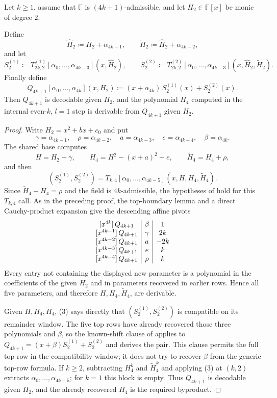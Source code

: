 \begin{lemma}\label{lem:Q4k+1-from-H2}
    Let $k\ge 1$, assume that $\mathbb F$ is $(4k+1)$-admissible, and let
    $H_2\in\mathbb{F}[x]$ be monic of degree $2$.

    Define
    \[
      \hat H_2 \coloneqq H_2+\alpha_{4k-1},
      \qquad
      \tilde H_2 \coloneqq \hat H_2+\alpha_{4k-2},
    \]
    and let
    \[
      S^{(1)}_2 \coloneqq T^{(1)}_{2k,2}[\alpha_0,\ldots,\alpha_{4k-3}](x,\hat H_2),
      \qquad
      S^{(2)}_2 \coloneqq T^{(2)}_{2k,2}[\alpha_0,\ldots,\alpha_{4k-3}](x,\hat H_2,\tilde H_2).
    \]
    Finally define
    \[
      Q_{4k+1}[\alpha_0,\ldots,\alpha_{4k}](x,H_2)\coloneqq (x+\alpha_{4k})\,S^{(1)}_2(x)+S^{(2)}_2(x).
    \]
    Then $Q_{4k+1}$ is decodable given $H_2$, and the polynomial $H_4$ computed in the internal even-$k$, $l=1$ step is derivable from $Q_{4k+1}$ given $H_2$.
\end{lemma}
\begin{proof}
    Write $H_2=x^2+bx+c_0$ and put
    \[
      \gamma=\alpha_{4k-1},\quad \rho=\alpha_{4k-2},\quad
      a=\alpha_{4k-3},\quad e=\alpha_{4k-4},\quad
      \beta=\alpha_{4k}.
    \]
    The shared base computes
    \[
      H=H_2+\gamma,\qquad
      H_4=H^2-(x+a)^2+e,\qquad
      \tilde H_4=H_4+\rho,
    \]
    and then
    \[
      (S^{(1)}_2,S^{(2)}_2)
       =T_{k,4}[\alpha_0,\ldots,\alpha_{4k-5}]
          (x,H,H_4,\tilde H_4).
    \]
    Since $\tilde H_4-H_4=\rho$ and the field is $4k$-admissible, the
    hypotheses of  hold for this $T_{k,4}$ call.
    As in the preceding proof, the top-boundary lemma and a direct Cauchy-product
    expansion give the descending affine pivots
    \[
    \begin{array}{c|c|c}
      \coeff{Q_{4k+1}}{4k}&\beta&1\\
      \coeff{Q_{4k+1}}{4k-1}&\gamma&2k\\
      \coeff{Q_{4k+1}}{4k-2}&a&-2k\\
      \coeff{Q_{4k+1}}{4k-3}&e&k\\
      \coeff{Q_{4k+1}}{4k-4}&\rho&k
    \end{array}
    \]
    Every entry not containing the displayed new parameter is a polynomial in
    the coefficients of the given $H_2$ and in parameters recovered in earlier
    rows.  Hence all five parameters, and therefore $H,H_4,\tilde H_4$, are
    derivable.

    Given $H,H_4,\tilde H_4$, (3) says directly that
    $(S^{(1)}_2,S^{(2)}_2)$ is compatible on its remainder window.  The five
    top rows have already recovered those three polynomials and $\beta$, so
    the known-shift clause of  applies to
    $Q_{4k+1}=(x+\beta)S^{(1)}_2+S^{(2)}_2$ and derives the pair.  This clause
    permits the full top row in the compatibility window; it does not try to
    recover $\beta$ from the generic top-row formula.
    If $k\ge2$, subtracting $H_4^k$ and $\tilde H_4^k$ and applying
    (3) at $(k,2)$ extracts
    $\alpha_0,\ldots,\alpha_{4k-5}$; for $k=1$ this block is empty.  Thus
    $Q_{4k+1}$ is decodable
    given $H_2$, and the already recovered $H_4$ is the required byproduct.
\end{proof}
